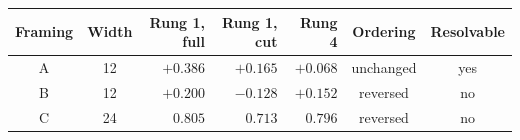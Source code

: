 \begin{tabular}{ccrrrcc}
\hline
Framing & Width & Rung 1, full & Rung 1, cut & Rung 4 & Ordering & Resolvable \\
\hline
A & 12 & $+0.386$ & $+0.165$ & $+0.068$ & unchanged & yes \\
B & 12 & $+0.200$ & $-0.128$ & $+0.152$ & reversed & no \\
C & 24 & $0.805$ & $0.713$ & $0.796$ & reversed & no \\
\hline
\end{tabular}
